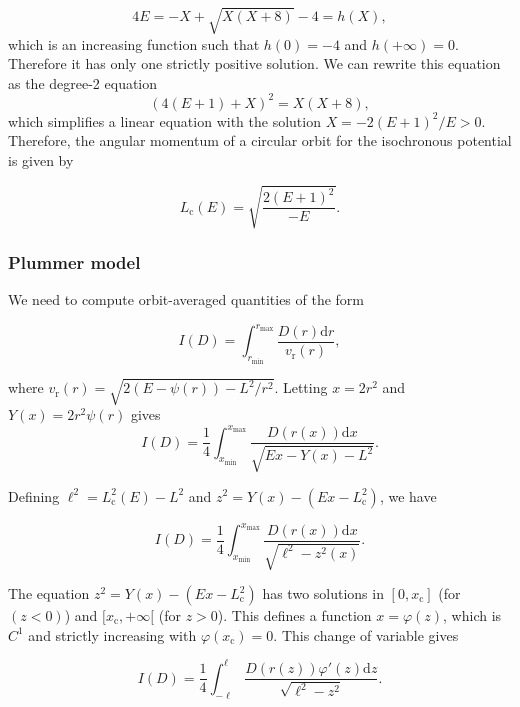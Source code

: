\documentclass[11pt]{article}
\newcommand{\rr}{\mathrm{r}}
\newcommand{\rc}{\mathrm{c}}
\newcommand{\vr}{v_{\rr}}
\newcommand{\rd}{{\mathrm{d}}}
\newcommand{\rmax}{r_{\max}}
\newcommand{\rmin}{r_{\min}}
\newcommand{\Lc}{L_{{\mathrm{c}}}}
\newcommand{\xc}{x_{\rc}}
\begin{document}
\begin{equation}
  4E=-X+\sqrt{X(X+8)}-4 = h(X) ,
  \label{eq:Lc2X}
\end{equation}
which is an increasing function such that $h(0)=-4$ and $h(+\infty)=0$. Therefore it has only one strictly positive solution. We can rewrite this equation as the degree-2 equation
\begin{equation}
  (4(E+1)+X)^{2}=X(X+8) ,
  \label{eq:Lc2X_poly2_equation}
\end{equation}
which simplifies a linear equation with the solution $X=-2(E+1)^{2}/E>0$. Therefore, the angular momentum of a circular orbit for the isochronous potential is given by

\begin{equation}
  \Lc(E) = \sqrt{\frac{2(E+1)^{2}}{-E}} .
  \label{eq:Ec_Iso}
  \end{equation}


\subsubsection{Plummer model}
\label{subsubsec:PlummerOrbitStudy}

We need to compute orbit-averaged quantities of the form

\begin{equation}
  I(D) = \int_{\rmin}^{\rmax}  \frac{D(r)\rd r}{\vr(r)} ,
  \label{eq:I(D)} 
\end{equation}

where $\vr(r)=\sqrt{2(E-\psi(r))-L^{2}/r^{2}}$. Letting $x=2r^{2}$ and $Y(x)=2r^{2}\psi(r)$ gives
\begin{equation}
  I(D) = \frac{1}{4}\int_{x_{\min}}^{x_{\max}}  \frac{D(r(x))\rd x}{\sqrt{E x - Y(x) -L^{2}}} .
  \label{eq:I(D)ChgX}
\end{equation}

Defining $\ell^{2} = \Lc^{2}(E)-L^{2}$ and $z^{2}=Y(x)-(E x - \Lc^{2})$, we have

\begin{equation}
 I(D) = \frac{1}{4}\int_{x_{\min}}^{x_{\max}}  \frac{D(r(x))\rd x}{\sqrt{\ell^{2}-z^{2}(x)}} .
  \label{eq:I(D)ChgX_Z}
\end{equation}

The equation  $z^{2}=Y(x)-(E x - \Lc^{2})$ has two solutions in $[0,\xc]$ (for $(z<0)$) and $[\xc,+\infty[$ (for $z>0$). This defines a function $x=\varphi(z)$, which is $C^{1}$ and strictly increasing with $\varphi(\xc)=0$. This change of variable gives

\begin{equation}
 I(D) = \frac{1}{4}\int_{-\ell}^{\ell}  \frac{D(r(z))\varphi'(z)\rd z}{\sqrt{\ell^{2}-z^{2}}} .
 \label{eq:I(D)Chgz}
\end{equation}
\end{document}
